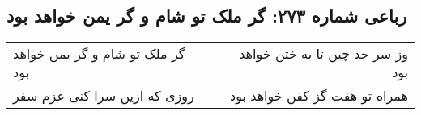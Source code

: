 \begin{center}
\section*{رباعی شماره ۲۷۳: گر ملک تو شام و گر یمن خواهد بود}
\label{sec:sh273}
\begin{longtable}{l p{0.5cm} r}
گر ملک تو شام و گر یمن خواهد بود
&&
وز سر حد چین تا به ختن خواهد بود
\\
روزی که ازین سرا کنی عزم سفر
&&
همراه تو هفت گز کفن خواهد بود
\\
\end{longtable}
\end{center}
